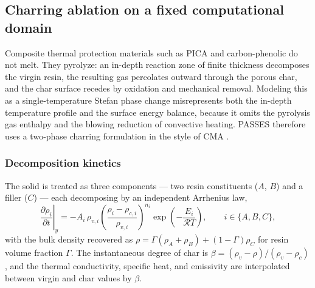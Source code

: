 \documentclass[11pt,a4paper]{article}
\theoremstyle{definition}
\numberwithin{equation}{section}
\begin{document}
\subsection{Charring ablation on a fixed computational domain}
\label{sec:ablation}

Composite thermal protection materials such as PICA and carbon-phenolic do not melt. They pyrolyze: an in-depth reaction zone of finite thickness decomposes the virgin resin, the resulting gas percolates outward through the porous char, and the char surface recedes by oxidation and mechanical removal. Modeling this as a single-temperature Stefan phase change misrepresents both the in-depth temperature profile and the surface energy balance, because it omits the pyrolysis gas enthalpy and the blowing reduction of convective heating. PASSES therefore uses a two-phase charring formulation in the style of CMA \cite{moyer1968, chen1999}.

\subsubsection{Decomposition kinetics}

The solid is treated as three components --- two resin constituents ($A$, $B$) and a filler ($C$) --- each decomposing by an independent Arrhenius law,
\begin{equation}
\label{eq:arrhenius}
\left.\frac{\partial \rho_i}{\partial t}\right|_{y}
= -A_i\, \rho_{v,i} \left( \frac{\rho_i - \rho_{c,i}}{\rho_{v,i}} \right)^{\!n_i} \exp\!\left( -\frac{E_i}{\mathcal{R} T} \right),
\qquad i \in \{A, B, C\},
\end{equation}
with the bulk density recovered as $\rho = \Gamma(\rho_A + \rho_B) + (1-\Gamma)\rho_C$ for resin volume fraction $\Gamma$. The instantaneous degree of char is $\beta = (\rho_v - \rho)/(\rho_v - \rho_c)$, and the thermal conductivity, specific heat, and emissivity are interpolated between virgin and char values by $\beta$.
\end{document}
